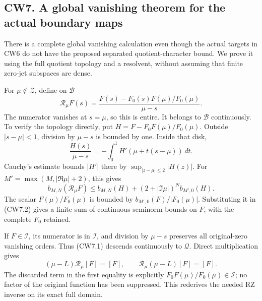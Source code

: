 \subsection{CW7. A global vanishing theorem for the actual boundary
maps}\label{cw7.-a-global-vanishing-theorem-for-the-actual-boundary-maps}

There is a complete global vanishing calculation even though the actual
targets in CW6 do not have the proposed separated quotient-character
bound. We prove it using the full quotient topology and a resolvent,
without assuming that finite zero-jet subspaces are dense.

For \(\mu\notin\mathscr Z\), define on \(\mathcal B\) \[
\mathcal R_\mu F(s)=
\frac{F(s)-F_0(s)F(\mu)/F_0(\mu)}{\mu-s}.
\tag{CW7.1}
\] The numerator vanishes at \(s=\mu\), so this is entire. It belongs to
\(\mathcal B\) continuously. To verify the topology directly, put
\(H=F-F_0F(\mu)/F_0(\mu)\). Outside \(|s-\mu|<1\), division by \(\mu-s\)
is bounded by one. Inside that disk, \[
\frac{H(s)}{\mu-s}
=-\int_0^1H'(\mu+t(s-\mu))\,dt.
\] Cauchy's estimate bounds \(|H'|\) there by
\(\sup_{|z-\mu|\le2}|H(z)|\). For \(M'=\max(M,|\Re\mu|+2)\), this gives
\[
b_{M,N}(\mathcal R_\mu F)
\le b_{M,N}(H)+(2+|\Im\mu|)^N b_{M',0}(H).
\tag{CW7.2}
\] The scalar \(F(\mu)/F_0(\mu)\) is bounded by
\(b_{M',0}(F)/|F_0(\mu)|\). Substituting it in (CW7.2) gives a finite
sum of continuous seminorm bounds on \(F\), with the complete \(F_0\)
retained.

If \(F\in\mathcal I\), its numerator is in \(\mathcal I\), and division
by \(\mu-s\) preserves all original-zero vanishing orders. Thus (CW7.1)
descends continuously to \(\mathcal Q\). Direct multiplication gives \[
(\mu-L)\mathcal R_\mu[F]=[F],\qquad
\mathcal R_\mu(\mu-L)[F]=[F].
\tag{CW7.3}
\] The discarded term in the first equality is explicitly
\(F_0F(\mu)/F_0(\mu)\in\mathcal I\); no factor of the original function
has been suppressed. This rederives the needed RZ inverse on its exact
full domain.

